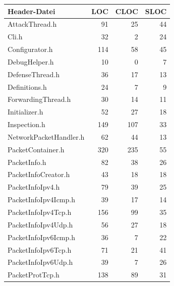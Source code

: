 \documentclass[../review_3.tex]{subfiles}
\begin{document}
\begin{longtable}[H]{p{10cm}rrr}
    \toprule
    \textbf{Header-Datei}   & \textbf{LOC} & \textbf{CLOC} & \textbf{SLOC} \\ \midrule \endhead
    AttackThread.h          & 91           & 25            & 44            \\
    Cli.h                   & 32           & 2             & 24            \\
    Configurator.h          & 114          & 58            & 45            \\
    DebugHelper.h           & 10           & 0             & 7             \\
    DefenseThread.h         & 36           & 17            & 13            \\
    Definitions.h           & 24           & 7             & 9             \\
    ForwardingThread.h      & 30           & 14            & 11            \\
    Initializer.h           & 52           & 27            & 18            \\ %
    Inspection.h            & 149          & 107           & 33            \\
    NetworkPacketHandler.h  & 62           & 44            & 13            \\
    PacketContainer.h       & 320          & 235           & 55            \\
    PacketInfo.h            & 82           & 38            & 26            \\
    PacketInfoCreator.h     & 43           & 18            & 18            \\
    PacketInfoIpv4.h        & 79           & 39            & 25            \\
    PacketInfoIpv4Icmp.h    & 39           & 17            & 14            \\
    PacketInfoIpv4Tcp.h     & 156          & 99            & 35            \\
    PacketInfoIpv4Udp.h     & 56           & 27            & 18            \\
    PacketInfoIpv6Icmp.h    & 36           & 7             & 22            \\
    PacketInfoIpv6Tcp.h     & 71           & 21            & 41            \\
    PacketInfoIpv6Udp.h     & 39           & 7             & 26            \\
    PacketProtTcp.h         & 138          & 89            & 31            \\

\end{longtable}
\end{document}
